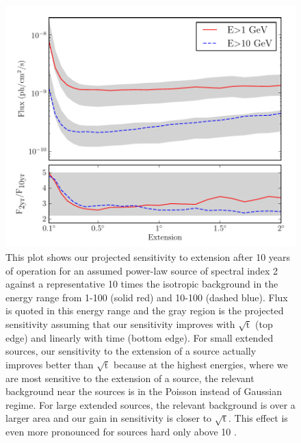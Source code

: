 \documentclass[12pt,preprint]{aastex}
\newcommand{\gev}{\text{GeV}\xspace}
\begin{document}
\begin{figure}
  \begin{center}
    \includegraphics{mc_plots/time_sensitivity.pdf}
    \end{center}
    \caption{
    This plot shows our projected sensitivity to extension after 10 years
    of operation for an assumed power-law source of spectral index
    2 against a representative 10 times the isotropic background in the
    energy range from 1-100 \gev (solid red) and 10-100 \gev (dashed
    blue). Flux is quoted in this energy range and the gray region is
    the projected sensitivity assuming that our sensitivity improves
    with $\sqrt{\text{t}}$ (top edge) and linearly with time (bottom
    edge). For small extended sources, our sensitivity to the extension
    of a source actually improves better than $\sqrt{\text{t}}$
    because at the highest energies, where we are most sensitive to the
    extension of a source, the relevant background near the sources is in
    the Poisson instead of Gaussian regime.  For large extended sources,
    the relevant background is over a larger area and our gain
    in sensitivity is closer to $\sqrt{\text{t}}$.  This effect is
    even more pronounced for sources hard only above 10 \gev.
    }\label{time_sensitivity}
  \end{figure}
\end{document}
